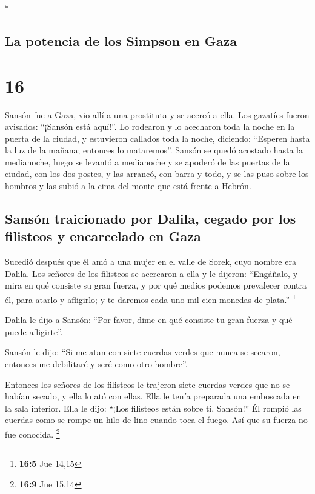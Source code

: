 \begin{paracol}{2}
\switchcolumn[0]*

\hypertarget{la-potencia-de-los-simpson-en-gaza}{%
\subsection{La potencia de los Simpson en
Gaza}\label{la-potencia-de-los-simpson-en-gaza}}

\hypertarget{section-30}{%
\section{16}\label{section-30}}

 Sansón fue a Gaza, vio allí a una prostituta y se acercó
a ella.  Los gazatíes fueron avisados: ``¡Sansón está
aquí!''. Lo rodearon y lo acecharon toda la noche en la puerta de la
ciudad, y estuvieron callados toda la noche, diciendo: ``Esperen hasta
la luz de la mañana; entonces lo mataremos''.  Sansón se
quedó acostado hasta la medianoche, luego se levantó a medianoche y se
apoderó de las puertas de la ciudad, con los dos postes, y las arrancó,
con barra y todo, y se las puso sobre los hombros y las subió a la cima
del monte que está frente a Hebrón.

\hypertarget{sansuxf3n-traicionado-por-dalila-cegado-por-los-filisteos-y-encarcelado-en-gaza}{%
\subsection{Sansón traicionado por Dalila, cegado por los filisteos y
encarcelado en
Gaza}\label{sansuxf3n-traicionado-por-dalila-cegado-por-los-filisteos-y-encarcelado-en-gaza}}

 Sucedió después que él amó a una mujer en el valle de
Sorek, cuyo nombre era Dalila.  Los señores de los
filisteos se acercaron a ella y le dijeron: ``Engáñalo, y mira en qué
consiste su gran fuerza, y por qué medios podemos prevalecer contra él,
para atarlo y afligirlo; y te daremos cada uno mil cien monedas de
plata.'' \footnote{\textbf{16:5} Jue 14,15}

 Dalila le dijo a Sansón: ``Por favor, dime en qué
consiste tu gran fuerza y qué puede afligirte''.

 Sansón le dijo: ``Si me atan con siete cuerdas verdes que
nunca se secaron, entonces me debilitaré y seré como otro hombre''.

 Entonces los señores de los filisteos le trajeron siete
cuerdas verdes que no se habían secado, y ella lo ató con ellas.
 Ella le tenía preparada una emboscada en la sala
interior. Ella le dijo: ``¡Los filisteos están sobre ti, Sansón!'' Él
rompió las cuerdas como se rompe un hilo de lino cuando toca el fuego.
Así que su fuerza no fue conocida. \footnote{\textbf{16:9} Jue 15,14}


\end{paracol}
